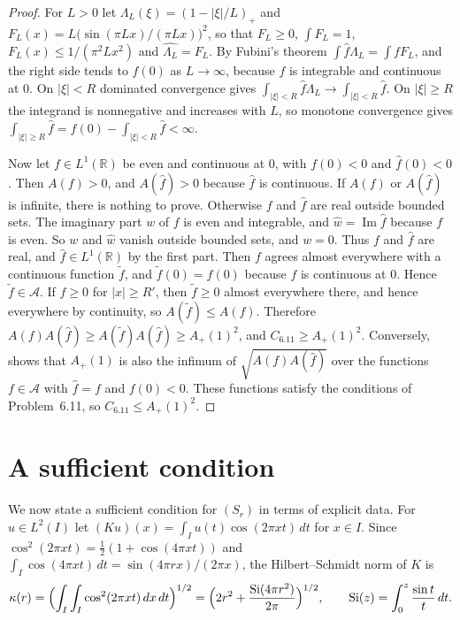 \documentclass[11pt]{amsart}
\theoremstyle{definition}
\theoremstyle{remark}
\numberwithin{equation}{section}
\newcommand{\R}{\mathbb{R}}
\newcommand{\Si}{\operatorname{Si}}
\newcommand{\cA}{\mathcal{A}}
\newcommand{\ft}[1]{\widehat{#1}}
\newcommand{\Ap}{A_+(1)}
\newcommand{\Csix}{C_{6.11}}
\begin{document}
\begin{proof}
For $L>0$ let $\Lambda_L(\xi)=(1-|\xi|/L)_+$ and $F_L(x)=L\bigl(\sin(\pi Lx)/(\pi Lx)\bigr)^2$, so that $F_L\ge0$, $\int F_L=1$, $F_L(x)\le1/(\pi^2Lx^2)$ and $\ft{\Lambda_L}=F_L$. By Fubini's theorem $\int\ft f\Lambda_L=\int fF_L$, and the right side tends to $f(0)$ as $L\to\infty$, because $f$ is integrable and continuous at $0$. On $|\xi|<R$ dominated convergence gives $\int_{|\xi|<R}\ft f\Lambda_L\to\int_{|\xi|<R}\ft f$. On $|\xi|\ge R$ the integrand is nonnegative and increases with $L$, so monotone convergence gives $\int_{|\xi|\ge R}\ft f=f(0)-\int_{|\xi|<R}\ft f<\infty$.

Now let $f\in L^1(\R)$ be even and continuous at $0$, with $f(0)<0$ and $\ft f(0)<0$. Then $A(f)>0$, and $A(\ft f)>0$ because $\ft f$ is continuous. If $A(f)$ or $A(\ft f)$ is infinite, there is nothing to prove. Otherwise $f$ and $\ft f$ are real outside bounded sets. The imaginary part $w$ of $f$ is even and integrable, and $\ft w=\operatorname{Im}\ft f$ because $f$ is even. So $w$ and $\ft w$ vanish outside bounded sets, and $w=0$. Thus $f$ and $\ft f$ are real, and $\ft f\in L^1(\R)$ by the first part. Then $f$ agrees almost everywhere with a continuous function $\tilde f$, and $\tilde f(0)=f(0)$ because $f$ is continuous at $0$. Hence $\tilde f\in\cA$. If $f\ge0$ for $|x|\ge R'$, then $\tilde f\ge0$ almost everywhere there, and hence everywhere by continuity, so $A(\tilde f)\le A(f)$. Therefore $A(f)A(\ft f)\ge A(\tilde f)A(\ft f)\ge\Ap^2$, and $\Csix\ge\Ap^2$. Conversely, \cite[Proposition~3]{GOR21} shows that $\Ap$ is also the infimum of $\sqrt{A(f)A(\ft f)}$ over the functions $f\in\cA$ with $\ft f=f$ and $f(0)<0$. These functions satisfy the conditions of Problem~6.11, so $\Csix\le\Ap^2$.
\end{proof}

\section{A sufficient condition}\label{sec:criterion}

We now state a sufficient condition for $(S_r)$ in terms of explicit data. For $u\in L^2(I)$ let $(Ku)(x)=\int_Iu(t)\cos(2\pi xt)\,dt$ for $x\in I$. Since $\cos^2(2\pi xt)=\frac12(1+\cos(4\pi xt))$ and $\int_I\cos(4\pi xt)\,dt=\sin(4\pi rx)/(2\pi x)$, the Hilbert--Schmidt norm of $K$ is
\begin{equation}\label{eq:kappa}
\kappa(r)=\Bigl(\int_I\int_I\cos^2(2\pi xt)\,dx\,dt\Bigr)^{1/2}=\Bigl(2r^2+\frac{\Si(4\pi r^2)}{2\pi}\Bigr)^{1/2},\qquad \Si(z)=\int_0^z\frac{\sin t}{t}\,dt.
\end{equation}
\end{document}
